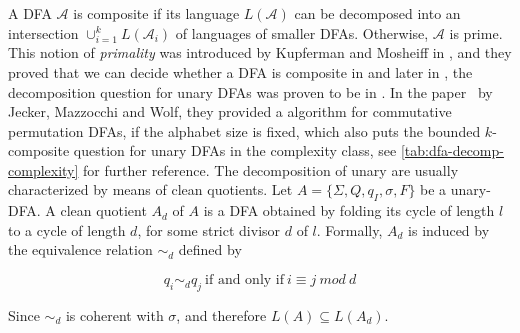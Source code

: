 A DFA $\mathcal{A}$ is composite if its language $L(\mathcal{A})$ can be decomposed into an intersection $\cup^k_{i=1} L(\mathcal{A}_i)$ of languages of smaller DFAs. Otherwise, $\mathcal{A}$ is prime. This notion of \textit{primality} was introduced by Kupferman and Mosheiff in \cite{prime-languages}, and they proved that we can decide whether a DFA is composite in \ExpSpace and later in \cite{unara-prime-languages}, the decomposition question for unary DFAs was proven to be in \LogSpace. In the paper~\cite{DBLP:journals/corr/abs-2107-04683} by Jecker, Mazzocchi and Wolf, they provided a \LogSpace algorithm for commutative permutation DFAs, if the alphabet size is fixed, which also puts the bounded $k$-composite question for unary DFAs in the \LogSpace complexity class, see \ref{tab:dfa-decomp-complexity} for further reference. The decomposition of unary \DFAs are usually characterized by means of clean quotients. Let  $A = \lbrace\Sigma, Q, q_I , \sigma, F\rbrace$ be a unary-DFA. A clean quotient $A_d$ of $A$ is a DFA obtained by folding its cycle of length $l$ to a cycle of length $d$, for some strict divisor $d$ of $l$. Formally, $A_d$ is induced by the equivalence relation $\sim_d$ defined by

\[ q_i \sim_d q_j ~\text{if and only if}~i \equiv j ~mod~ d \]

Since $\sim_d$ is coherent with $\sigma$, and therefore $L(A) \subseteq L(A_d)$.

